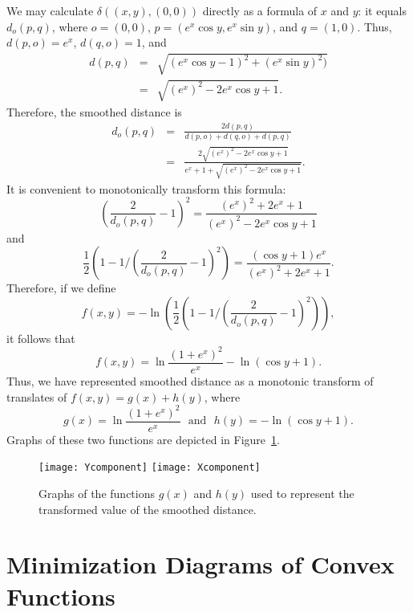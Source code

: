 \documentclass[10pt, conference, compsocconf]{IEEEtran}
\begin{document}
We may calculate $\delta((x,y),(0,0))$ directly as a formula of $x$ and $y$:
it equals $d_o(p,q)$, where $o=(0,0)$, $p=(e^x\cos y,e^x\sin y)$, and $q=(1,0)$.
Thus, $d(p,o)=e^x$, $d(q,o)=1$, and
\begin{eqnarray*}
d(p,q)&=&\sqrt{(e^x\cos y - 1)^2 + (e^x\sin y)^2)}\\
&=&\sqrt{(e^x)^2 - 2e^x\cos y + 1}.
\end{eqnarray*}
Therefore, the smoothed distance is
\begin{eqnarray*}
d_o(p,q)&=&\frac{2d(p,q)}{d(p,o)+d(q,o)+d(p,q)}\\
&=&\frac{2\sqrt{(e^x)^2 - 2e^x\cos y + 1}}{e^x + 1 + \sqrt{(e^x)^2 - 2e^x\cos y + 1}}.
\end{eqnarray*}
It is convenient to monotonically transform this formula:
$$\left(\frac{2}{d_o(p,q)}-1\right)^2=\frac{(e^x)^2+2e^x+1}{(e^x)^2 - 2e^x\cos y + 1}$$
and
$$\frac12\left(1-1/\left(\frac{2}{d_o(p,q)}-1\right)^2\right)=\frac{(\cos y + 1)e^x}{(e^x)^2+2e^x+1}.$$
Therefore, if we define
$$f(x,y)=-\ln\left(\frac12\left(1-1/\left(\frac{2}{d_o(p,q)}-1\right)^2\right)\right),$$
it follows that
$$f(x,y)=\ln\frac{(1+e^x)^2}{e^x} - \ln(\cos y + 1).$$
Thus, we have represented smoothed distance as a monotonic transform of  translates of $f(x,y)=g(x)+h(y)$, where
$$g(x)=\ln\frac{(1+e^x)^2}{e^x}
\mbox{~~and~~}
h(y)= - \ln(\cos y + 1).$$
Graphs of these two functions are depicted in Figure~\ref{fig:components}.

\begin{figure}[t]
\centering\texttt{[image: Ycomponent]}
\qquad\texttt{[image: Xcomponent]}
\caption{Graphs of the functions $g(x)$ and $h(y)$ used to represent the transformed value of the smoothed distance.}
\label{fig:components}
\end{figure}

\section{Minimization Diagrams of Convex Functions}
\label{sec:mdcf}
\end{document}
